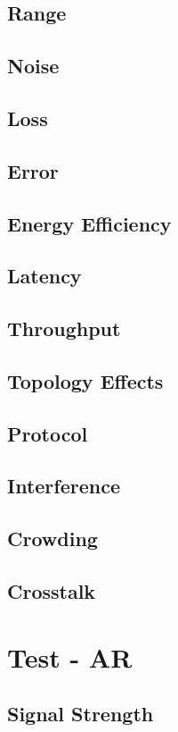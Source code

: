\subsection{Range}
\subsection{Noise}
\subsection{Loss}
\subsection{Error}
\subsection{Energy Efficiency}
\subsection{Latency}
\subsection{Throughput}
\subsection{Topology Effects}
\subsection{Protocol}
\subsection{Interference}
\subsection{Crowding}
\subsection{Crosstalk}


\section{Test - AR}

\subsection{Signal Strength}

